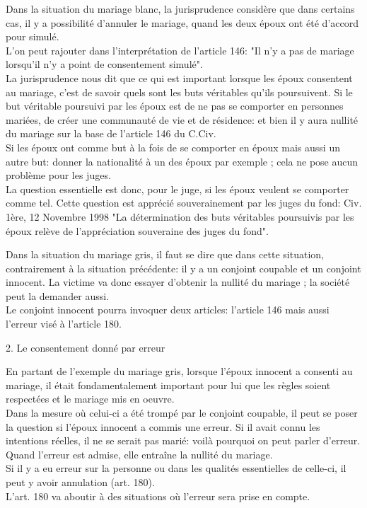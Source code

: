 \documentclass[12pt, a4paper, openany]{book}
\begin{document}
Dans la situation du mariage blanc, la jurisprudence considère que dans certains cas, il y a possibilité d'annuler le mariage, quand les deux époux ont été d'accord pour simulé. \\
L'on peut rajouter dans l'interprétation de l'article 146: "Il n'y a pas de mariage lorsqu'il n'y a point de consentement simulé". \\
La jurisprudence nous dit que ce qui est important lorsque les époux consentent au mariage, c'est de savoir quels sont les buts véritables qu'ils poursuivent. Si le but véritable poursuivi par les époux est de ne pas se comporter en personnes mariées, de créer une communauté de vie et de résidence: et bien il y aura nullité du mariage sur la base de l'article 146 du C.Civ. \\
Si les époux ont comme but à la fois de se comporter en époux mais aussi un autre but: donner la nationalité à un des époux par exemple ; cela ne pose aucun problème pour les juges. \\
La question essentielle est donc, pour le juge, si les époux veulent se comporter comme tel. Cette question est apprécié souverainement par les juges du fond: Civ. 1ère, 12 Novembre 1998 "La détermination des buts véritables poursuivis par les époux relève de l'appréciation souveraine des juges du fond". 


Dans la situation du mariage gris, il faut se dire que dans cette situation, contrairement à la situation précédente: il y a un conjoint coupable et un conjoint innocent. La victime va donc essayer d'obtenir la nullité du mariage ; la société peut la demander aussi. \\
Le conjoint innocent pourra invoquer deux articles: l'article 146 mais aussi l'erreur visé à l'article 180. 


2. Le consentement donné par erreur


En partant de l'exemple du mariage gris, lorsque l'époux innocent a consenti au mariage, il était fondamentalement important pour lui que les règles soient respectées et le mariage mis en oeuvre. \\
Dans la mesure où celui-ci a été trompé par le conjoint coupable, il peut se poser la question si l'époux innocent a commis une erreur. Si il avait connu les intentions réelles, il ne se serait pas marié: voilà pourquoi on peut parler d'erreur. Quand l'erreur est admise, elle entraîne la nullité du mariage. \\
Si il y a eu erreur sur la personne ou dans les qualités essentielles de celle-ci, il peut y avoir annulation (art. 180). \\
L'art. 180 va aboutir à des situations où l'erreur sera prise en compte.
\end{document}
